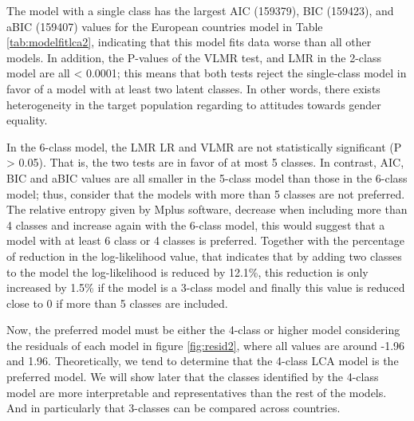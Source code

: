 \documentclass[12pt,a4paper,oneside]{reedthesis}
\begin{document}
The model with a single class has the largest AIC (159379), BIC (159423), and aBIC (159407) values for the European countries model in Table \ref{tab:modelfitlca2}, indicating that this model fits data worse than all other models. In addition, the P-values of the VLMR test, and LMR in the 2-class model are all \textless{} 0.0001; this means that both tests reject the single-class model in favor of a model with at least two latent classes. In other words, there exists heterogeneity in the target population regarding to attitudes towards gender equality.

In the 6-class model, the LMR LR and VLMR are not statistically significant (P \textgreater{} 0.05). That is, the two tests are in favor of at most 5 classes. In contrast, AIC, BIC and aBIC values are all smaller in the 5-class model than those in the 6-class model; thus, consider that the models with more than 5 classes are not preferred. The relative entropy given by Mplus software, decrease when including more than 4 classes and increase again with the 6-class model, this would suggest that a model with at least 6 class or 4 classes is preferred. Together with the percentage of reduction in the log-likelihood value, that indicates that by adding two classes to the model the log-likelihood is reduced by 12.1\%, this reduction is only increased by 1.5\% if the model is a 3-class model and finally this value is reduced close to 0 if more than 5 classes are included.

Now, the preferred model must be either the 4-class or higher model considering the residuals of each model in figure \ref{fig:resid2}, where all values are around -1.96 and 1.96. Theoretically, we tend to determine that the 4-class LCA model is the preferred model. We will show later that the classes identified by the 4-class model are more interpretable and representatives than the rest of the models. And in particularly that 3-classes can be compared across countries.
\end{document}
